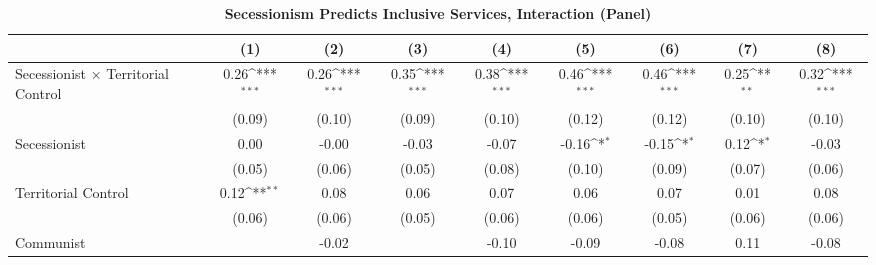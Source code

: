 \documentclass[12pt, letterpaper]{article}
\begin{document}
\begin{landscape}
\begin{table}[htbp]\centering
\begin{footnotesize}
\def\sym#1{\ifmmode^{#1}\else\(^{#1}\)\fi}
\renewcommand\thetable{A.\Roman{table}}
\makeatletter
\def\myrow{}
\CT@everycr{\noalign{%
\global\let\CT@row@color\relax
\stepcounter{mym14}%
\ifnum\value{mym14}=2
  \gdef\myrow{\rowcolor{gray!50}}
\else\ifnum\value{mym14}=8
  \gdef\myrow{}
\fi\fi
}\myrow}
\caption{\textbf{Secessionism Predicts Inclusive Services, Interaction (Panel)}}
\label{table:mainintp}
\begin{tabular}{l*{8}{c}}
\hline\hline
                    &\multicolumn{1}{c}{(1)}&\multicolumn{1}{c}{(2)}&\multicolumn{1}{c}{(3)}&\multicolumn{1}{c}{(4)}&\multicolumn{1}{c}{(5)}&\multicolumn{1}{c}{(6)}&\multicolumn{1}{c}{(7)}&\multicolumn{1}{c}{(8)}\\
\hline
Secessionist  $\times$ Territorial Control&        0.26\sym{***}&        0.26\sym{***}&        0.35\sym{***}&        0.38\sym{***}&        0.46\sym{***}&        0.46\sym{***}&        0.25\sym{**} &        0.32\sym{***}\\
                    &      (0.09)         &      (0.10)         &      (0.09)         &      (0.10)         &      (0.12)         &      (0.12)         &      (0.10)         &      (0.10)         \\
Secessionist      &        0.00         &       -0.00         &       -0.03         &       -0.07         &       -0.16\sym{*}  &       -0.15\sym{*}  &        0.12\sym{*}  &       -0.03         \\
                    &      (0.05)         &      (0.06)         &      (0.05)         &      (0.08)         &      (0.10)         &      (0.09)         &      (0.07)         &      (0.06)         \\
Territorial Control&        0.12\sym{**} &        0.08         &        0.06         &        0.07         &        0.06         &        0.07         &        0.01         &        0.08         \\
                    &      (0.06)         &      (0.06)         &      (0.05)         &      (0.06)         &      (0.06)         &      (0.05)         &      (0.06)         &      (0.06)         \\
Communist           &                     &       -0.02         &                     &       -0.10         &       -0.09         &       -0.08         &        0.11         &       -0.08         \\

\end{tabular}
\end{footnotesize}
\end{table}
\end{landscape}
\end{document}
